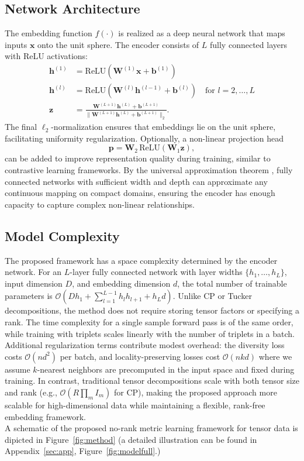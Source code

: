 \documentclass[a4paper,12pt,reqno]{amsart}
\theoremstyle{definition}
\theoremstyle{remark}
\begin{document}
\subsection{Network Architecture}
	The embedding function $f(\cdot)$ is realized as a deep neural network that maps inputs $\mathbf{x}$ onto the unit sphere. The encoder consists of $L$ fully connected layers with ReLU activations:
\begin{align}
	\mathbf{h}^{(1)} &= \text{ReLU}(\mathbf{W}^{(1)} \mathbf{x} + \mathbf{b}^{(1)}) \\
	\mathbf{h}^{(l)} &= \text{ReLU}(\mathbf{W}^{(l)} \mathbf{h}^{(l-1)} + \mathbf{b}^{(l)}) \quad \text{for } l = 2,\ldots,L \\
	\mathbf{z} &= \frac{\mathbf{W}^{(L+1)} \mathbf{h}^{(L)} + \mathbf{b}^{(L+1)}}{\|\mathbf{W}^{(L+1)} \mathbf{h}^{(L)} + \mathbf{b}^{(L+1)}\|_2}.
\end{align}
The final $\ell_2$-normalization ensures that embeddings lie on the unit sphere, facilitating uniformity regularization. Optionally, a non-linear projection head
	\begin{equation}
		\mathbf{p} = \mathbf{W}_2 \, \text{ReLU}(\mathbf{W}_1 \mathbf{z}),
	\end{equation}
	can be added to improve representation quality during training, similar to contrastive learning frameworks. By the universal approximation theorem \cite{hornik1989multilayer}, fully connected networks with sufficient width and depth can approximate any continuous mapping on compact domains, ensuring the encoder has enough capacity to capture complex non-linear relationships.
\subsection{Model Complexity}
	The proposed framework has a space complexity determined by the encoder network. For an $L$-layer fully connected network with layer widths $\{h_1,\dots,h_L\}$, input dimension $D$, and embedding dimension $d$, the total number of trainable parameters is $\mathcal{O}(D h_1 + \sum_{l=1}^{L-1} h_l h_{l+1} + h_L d)$. Unlike CP or Tucker decompositions, the method does not require storing tensor factors or specifying a rank. The time complexity for a single sample forward pass is of the same order, while training with triplets scales linearly with the number of triplets in a batch. Additional regularization terms contribute modest overhead: the diversity loss costs $\mathcal{O}(n d^2)$ per batch, and locality-preserving losses cost $\mathcal{O}(n k d)$ where we assume $k$-nearest neighbors are precomputed in the input space and fixed during training. In contrast, traditional tensor decompositions scale with both tensor size and rank (e.g., $\mathcal{O}(R \prod_m I_m)$ for CP), making the proposed approach more scalable for high-dimensional data while maintaining a flexible, rank-free embedding framework.\\
A schematic of the proposed no-rank metric learning framework for tensor data is dipicted in Figure~\ref{fig:method} (a detailed illustration can be found in Appendix~\ref{sec:app}, Figure~\ref{fig:modelfull}.) 
\end{document}
